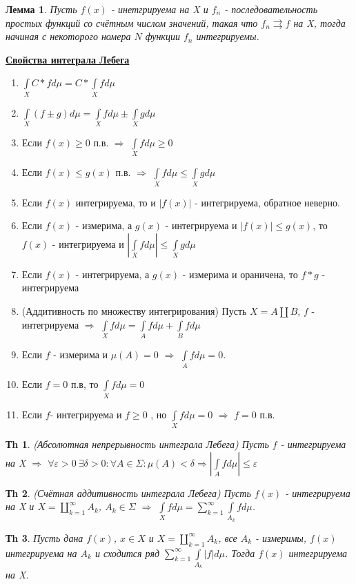 \documentclass[14pt]{article}
\theoremstyle{plain}
\newtheorem{Thm}{Тh}
\newtheorem{Lem}{Лемма}
\theoremstyle{definition}
\begin{document}
			\begin{Lem}
				Пусть $f(x)$ - инетгрируема на X и $f_n$ - последовательность простых функций со счётным числом значений, такая что $f_n \rightrightarrows f$  на X, тогда начиная с некоторого номера $N$ функции $f_n$ интегрируемы. 
			\end{Lem}
			\underline{\bf{Свойства интеграла Лебега}}
			\begin{enumerate}
				\item $\int\limits_{X}C* f d\mu = C* \int\limits_{X} f d\mu$
				\item $\int\limits_{X} (f \pm g) d\mu = \int\limits_{X} f d\mu \pm \int\limits_{X} g d\mu$
				\item Если $f(x) \geq 0$ п.в. $\Rightarrow$ $\int\limits_X f d\mu \geq 0$
				\item Если $f(x) \leq g(x)$ п.в. $\Rightarrow$ $\int\limits_X f d\mu \leq \int\limits_X g d\mu$
				\item Если $f(x)$ интегрируема, то и $|f(x)|$ - интегрируема, обратное неверно.
				\item Если $f(x)$ - измерима, а $g(x)$ - интегрируема и $|f(x)| \leq g(x)$, то $f(x)$ - интегрируема и $|\int\limits_X f d\mu| \leq \int\limits_X g d\mu$
				\item Если $f(x)$ - интегрируема, а $g(x)$ - измерима и ораничена, то $f*g$ - интегрируема
				\item (Аддитивность по множеству интегрирования) Пусть $X = A \coprod B$, $f$ - интегрируема $\Rightarrow$ $\int\limits_X f d\mu = \int\limits_A f d\mu + \int\limits_B f d\mu$
				\item Если $f$ - измерима и $\mu(A) = 0$ $\Rightarrow$ $\int\limits_A f d\mu = 0$.
				\item Если $f = 0$ п.в, то $\int\limits_X f d\mu = 0$
				\item Если $f$- интегрируема и $f \geq 0$ , но  $\int\limits_X f d\mu = 0$ $\Rightarrow$ $ f = 0$ п.в. 
			\end{enumerate}
			\begin{Thm}
				(Абсолютная непрерывность интеграла Лебега) \newline
				Пусть  $f$ - интегрируема на X $\Rightarrow$ $\forall \varepsilon > 0 \  \exists \delta > 0:  \forall A \in \Sigma: \mu(A) < \delta \Rightarrow |\int\limits_A f d\mu| \leq \varepsilon$	
			\end{Thm}
			\begin{Thm}
				(Счётная аддитивность интеграла Лебега) \newline
				Пусть $f(x)$ - интегрируема на X и $X = \coprod\limits_{k=1}^{\infty} A_k$, $A_k \in \Sigma$ $\Rightarrow$ $\int\limits_X f d\mu = \sum\limits_{k=1}^{\infty} \int\limits_{A_k} f d\mu$. 
			\end{Thm}
			\begin{Thm}
				Пусть дана $f(x)$, $x \in X$ и $X = \coprod\limits_{k=1}^{\infty} A_k$, все $A_k$ - измеримы, $f(x)$ интегрируема на $A_k$ и сходится ряд $\sum\limits_{k=1}^{\infty} \int\limits_{A_k} |f| d\mu$. Тогда $f(x)$ интегрируема на X.
			\end{Thm}
\end{document}
